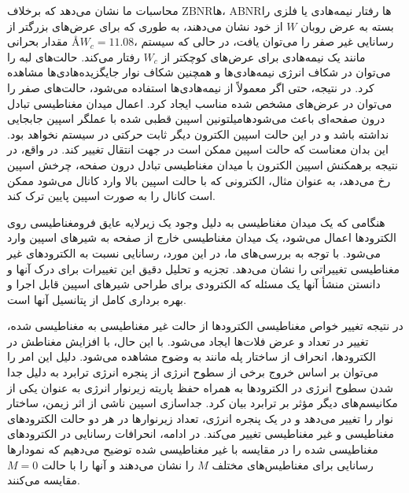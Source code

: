 محاسبات ما نشان ‌‌می‌‌دهد که برخلاف \gls{ZBNR}‌ها، \gls{ABNR}ها رفتار نیمه‌هادی یا فلزی را بسته به عرض روبان $W$ از خود نشان ‌‌می‌‌دهند، به طوری که برای عرض‌های بزرگتر از مقدار بحرانی \AA $W_c = 11.08$، \cite{nikanEffectsEdgeDefects2022} رسانایی غیر صفر را ‌‌می‌‌توان یافت، در حالی که سیستم مانند یک نیمه‌هادی برای عرض‌های کوچکتر از $W_c$ رفتار ‌‌می‌‌کند. حالت‌های لبه را ‌‌می‌‌توان در شکاف انرژی نیمه‌هادی‌ها و همچنین شکاف نوار جایگزیده‌هادی‌ها مشاهده کرد. در نتیجه، حتی اگر معمولاً از نیمه‌هادی‌ها استفاده ‌‌می‌‌شود، حالت‌های صفر را ‌‌می‌‌توان در عرض‌های مشخص شده مناسب ایجاد کرد. اعمال ‌میدان مغناطیسی تبادل درون صفحه‌ای باعث ‌‌می‌‌شود‌ها‌میلتونین اسپین قطبی شده با عملگر اسپین  جابجایی نداشته باشد و در این حالت اسپین الکترون دیگر ثابت حرکتی در سیستم نخواهد بود. این بدان معناست که حالت اسپین ممکن است در جهت انتقال تغییر کند. در واقع، در نتیجه برهمکنش اسپین الکترون با ‌میدان مغناطیسی تبادل درون صفحه، چرخش اسپین رخ ‌می‌دهد، به عنوان مثال، الکترونی که با حالت اسپین بالا وارد کانال ‌می‌شود ممکن است کانال را به صورت اسپین پایین ترک کند. 

هنگا‌‌می‌‌ که یک ‌میدان مغناطیسی به دلیل وجود یک زیرلایه عایق فرومغناطیسی روی الکترودها اعمال ‌‌می‌‌شود، یک ‌میدان مغناطیسی خارج از صفحه به شیرهای اسپین وارد ‌‌می‌‌شود. با توجه به بررسی‌های ما، در این مورد، رسانایی نسبت به الکترودهای غیر مغناطیسی تغییراتی را نشان ‌‌می‌‌دهد. تجزیه و تحلیل دقیق این تغییرات برای درک آنها و دانستن منشأ آنها یک مسئله که الکترودی برای طراحی شیرهای اسپین قابل اجرا و بهره برداری کامل از پتانسیل آنها است. 

در نتیجه تغییر خواص مغناطیسی الکترودها از حالت غیر مغناطیسی به مغناطیسی شده، تغییر در تعداد و عرض فلات‌ها ایجاد ‌‌می‌‌شود. با این حال، با افزایش مغناطش در الکترودها، انحراف از ساختار پله مانند به وضوح مشاهده ‌‌می‌‌شود. دلیل این امر را ‌‌می‌‌توان بر اساس خروج برخی از سطوح انرژی از پنجره انرژی ترابرد به دلیل جدا شدن سطوح انرژی در الکترودها به همراه حفظ پاریته زیرنوار انرژی به عنوان یکی از مکانیسم‌های دیگر مؤثر بر ترابرد بیان کرد. جداسازی اسپین ناشی از \gls{اثر زیمن}، ساختار نوار را تغییر ‌می‌‌دهد و در یک پنجره انرژی، تعداد زیر‌نوارها در هر دو حالت الکترودهای مغناطیسی و غیر مغناطیسی تغییر ‌می‌‌کند. در ادامه، انحرافات رسانایی در الکترودهای مغناطیسی شده را در مقایسه با غیر مغناطیسی شده توضیح ‌‌می‌‌دهیم که نمودارها رسانایی برای مغناطیس‌های مختلف $M$ را نشان ‌‌می‌‌دهند و آنها را با حالت $M = 0$ مقایسه ‌‌می‌‌کنند.

